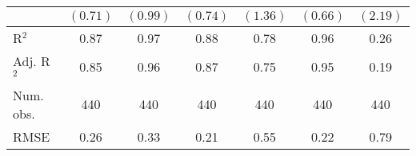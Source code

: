 \documentclass[fullpage]{paper}
\begin{document}
\begin{center}
\begin{longtable}{l c c c c c c }
            & $(0.71)$      & $(0.99)$       & $(0.74)$      & $(1.36)$       & $(0.66)$       & $(2.19)$      \\
\hline
R$^2$       & 0.87          & 0.97           & 0.88          & 0.78           & 0.96           & 0.26          \\
Adj. R$^2$  & 0.85          & 0.96           & 0.87          & 0.75           & 0.95           & 0.19          \\
Num. obs.   & 440           & 440            & 440           & 440            & 440            & 440           \\
RMSE        & 0.26          & 0.33           & 0.21          & 0.55           & 0.22           & 0.79          \\
\end{longtable}
\end{center}
\end{document}
